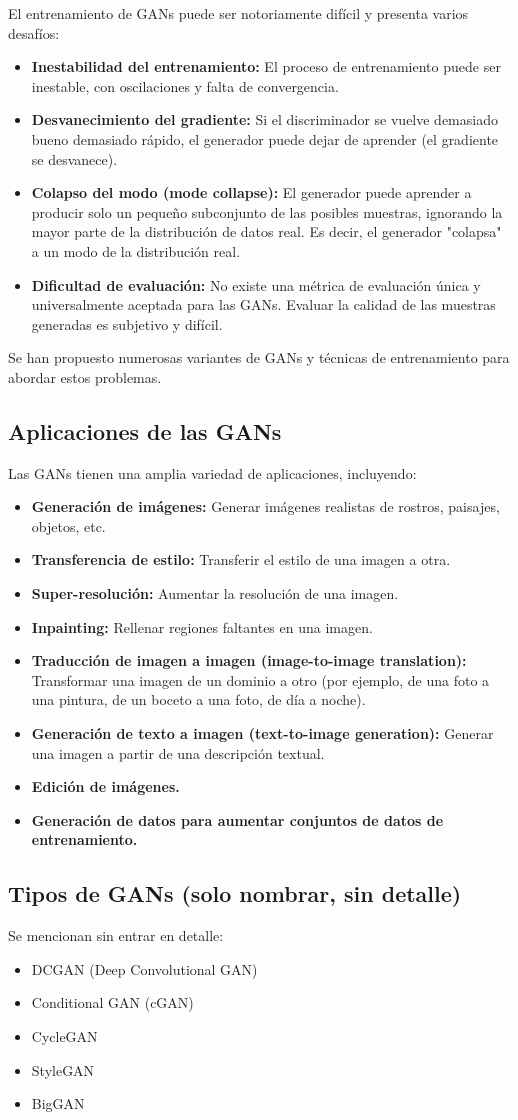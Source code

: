 \documentclass{article}
\begin{document}
El entrenamiento de GANs puede ser notoriamente difícil y presenta varios desafíos:

\begin{itemize}
    \item \textbf{Inestabilidad del entrenamiento:}  El proceso de entrenamiento puede ser inestable, con oscilaciones y falta de convergencia.
    \item \textbf{Desvanecimiento del gradiente:}  Si el discriminador se vuelve demasiado bueno demasiado rápido, el generador puede dejar de aprender (el gradiente se desvanece).
    \item \textbf{Colapso del modo (mode collapse):}  El generador puede aprender a producir solo un pequeño subconjunto de las posibles muestras, ignorando la mayor parte de la distribución de datos real. Es decir, el generador "colapsa" a un modo de la distribución real.
    \item \textbf{Dificultad de evaluación:}  No existe una métrica de evaluación única y universalmente aceptada para las GANs.  Evaluar la calidad de las muestras generadas es subjetivo y difícil.
\end{itemize}

Se han propuesto numerosas variantes de GANs y técnicas de entrenamiento para abordar estos problemas.

\subsection{Aplicaciones de las GANs}
Las GANs tienen una amplia variedad de aplicaciones, incluyendo:

\begin{itemize}
    \item \textbf{Generación de imágenes:}  Generar imágenes realistas de rostros, paisajes, objetos, etc.
    \item \textbf{Transferencia de estilo:}  Transferir el estilo de una imagen a otra.
    \item \textbf{Super-resolución:}  Aumentar la resolución de una imagen.
    \item \textbf{Inpainting:}  Rellenar regiones faltantes en una imagen.
    \item \textbf{Traducción de imagen a imagen (image-to-image translation):}  Transformar una imagen de un dominio a otro (por ejemplo, de una foto a una pintura, de un boceto a una foto, de día a noche).
    \item \textbf{Generación de texto a imagen (text-to-image generation):}  Generar una imagen a partir de una descripción textual.
    \item \textbf{Edición de imágenes.}
    \item \textbf{Generación de datos para aumentar conjuntos de datos de entrenamiento.}
\end{itemize}
\subsection{Tipos de GANs (solo nombrar, sin detalle)}
Se mencionan sin entrar en detalle:
\begin{itemize}
    \item DCGAN (Deep Convolutional GAN)
    \item Conditional GAN (cGAN)
    \item CycleGAN
    \item StyleGAN
    \item BigGAN
\end{itemize}
\end{document}
